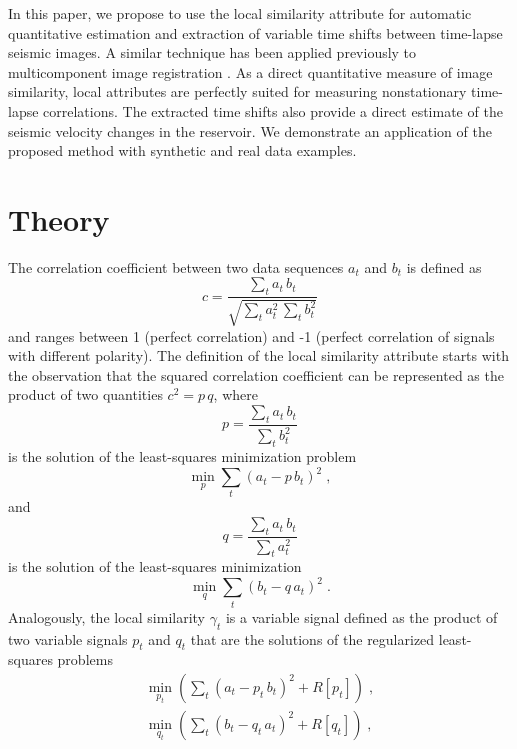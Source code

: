 In this paper, we propose to use the local similarity attribute
\cite[]{attr} for automatic quantitative estimation and extraction of
variable time shifts between time-lapse seismic images. A similar
technique has been applied previously to multicomponent image
registration \cite[]{warp}.  As a direct quantitative measure of image
similarity, local attributes are perfectly suited for measuring
nonstationary time-lapse correlations. The extracted time shifts
 also provide a direct estimate of the seismic velocity
changes in the reservoir. We demonstrate an application of the
proposed method with synthetic and real data examples.

\section{Theory}
The correlation coefficient between two data sequences $a_t$ and $b_t$
is defined as 
\begin{equation}
  {c} = {\frac{\displaystyle \sum_t a_t\,b_t}{\displaystyle \sqrt{ \sum_t a_t^2\,\sum_t b_t^2}}}
\label{eq:c}
\end{equation}
and ranges between 1 (perfect correlation) and -1 (perfect correlation
of signals with different polarity). The definition of the local
similarity attribute \cite[]{attr} starts with the observation that
the squared correlation coefficient can be represented as the product
of two quantities $c^2 = p\,q$, where 
\[ 
p=\frac{\displaystyle \sum_t a_t\,b_t}{\displaystyle \sum_t b_t^2}
\]
is the solution of the least-squares minimization problem
\begin{equation}
  \label{eq:p}
  \min_p \sum_t \left(a_t - p\,b_t\right)^2\;,
\end{equation}
and 
\[
q = \frac{\displaystyle \sum_t a_t\,b_t}{\displaystyle \sum_t a_t^2}
\]
 is the solution of the least-squares minimization
\begin{equation}
  \label{eq:q}
  \min_q \sum_t \left(b_t - q\,a_t\right)^2\;.
\end{equation}
Analogously, the local similarity $\gamma_t$ is a variable signal
defined as the product of two variable signals $p_t$ and $q_t$ that
are the solutions of the regularized least-squares problems
\begin{eqnarray}
  \label{eq:pt}
  \min_{p_t} 
  \left(\sum\nolimits_t \left(a_t - p_t\,b_t\right)^2 + R\left[p_t\right]\right)\;, \\
   \label{eq:qt}
   \min_{q_t}
   \left(\sum\nolimits_t \left(b_t - q_t\,a_t\right)^2 + R\left[q_t\right]\right)\;,
\end{eqnarray}
